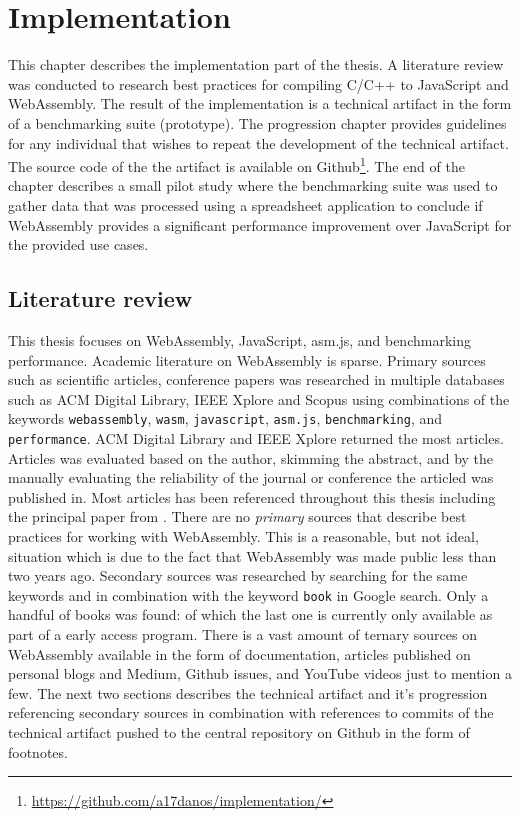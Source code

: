 \section{Implementation}
\label{implementation}

This chapter describes the implementation part of the thesis. A literature review was conducted to research best practices for compiling C/C++ to JavaScript and WebAssembly.
The result of the implementation is a technical artifact in the form of a benchmarking suite (prototype). The progression chapter provides guidelines for any individual that wishes to repeat the development of the technical artifact. The source code of the the artifact is available on Github\footnote{\url{https://github.com/a17danos/implementation/}}. The end of the chapter describes a small pilot study where the benchmarking suite was used to gather data that was processed using a spreadsheet application to conclude if WebAssembly provides a significant performance improvement over JavaScript for the provided use cases.

\subsection{Literature review}

This thesis focuses on WebAssembly, JavaScript, asm.js, and benchmarking performance. Academic literature on WebAssembly is sparse. Primary sources such as scientific articles, conference papers was researched in multiple databases such as ACM Digital Library, IEEE Xplore and Scopus using combinations of the keywords \texttt{webassembly}, \texttt{wasm}, \texttt{javascript}, \texttt{asm.js}, \texttt{benchmarking}, and \texttt{performance}. ACM Digital Library and IEEE Xplore returned the most articles. Articles was evaluated based on the author, skimming the abstract, and by the manually evaluating the reliability of the journal or conference the articled was published in. Most articles has been referenced throughout this thesis including the principal paper from \textcite{HaasRossbergSchuffTitzerHolmanGohmanWagnerZakaiBastien2017}. There are no \emph{primary} sources that describe best practices for working with WebAssembly. This is a reasonable, but not ideal, situation which is due to the fact that WebAssembly was made public less than two years ago. Secondary sources was researched by searching for the same keywords and in combination with the keyword \texttt{book} in Google search. Only a handful of books was found: \textcite{Barker2012,Rourke2018,Gallant2019} of which the last one is currently only available as part of a early access program. There is a vast amount of ternary sources on WebAssembly available in the form of documentation, articles published on personal blogs and Medium, Github issues, and YouTube videos just to mention a few. The next two sections describes the technical artifact and it's progression referencing secondary sources in combination with references to commits of the technical artifact pushed to the central repository on Github in the form of footnotes.

